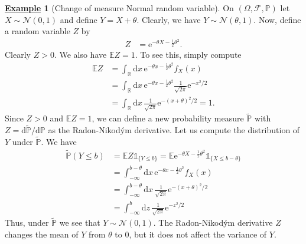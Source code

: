 \documentclass[12pt]{book}
\numberwithin{equation}{chapter}
\theoremstyle{plain}
\numberwithin{theorem}{section}
\theoremstyle{definition}
\newtheorem{example}[theorem]{\underline{Example}}
\numberwithin{exercise}{chapter}
\newcommand{\<}{\langle}
\renewcommand{\>}{\rangle}
\renewcommand{\(}{\left(}
\renewcommand{\)}{\right)}
\renewcommand{\[}{\left[}
\renewcommand{\]}{\right]}
\newcommand\Eb{\mathds{E}}
\newcommand\Ib{\mathds{1}} 	%
\newcommand\Pb{\mathds{P}}
\newcommand\Rb{\mathds{R}}
\newcommand\Fc{\mathscr{F}}
\newcommand\Nc{\mathscr{N}}
\newcommand\Om{\Omega}
\newcommand\Pbt{\widetilde{\Pb}}
\newcommand\dd{\mathrm{d}}
\newcommand\ee{\mathrm{e}}
\begin{document}
\begin{example}[Change of measure Normal random variable]
\label{ex:normal.meas.change}
On $(\Om, \Fc, \Pb)$ let $X \sim \Nc(0,1)$ and define $Y = X + \theta$.  Clearly, we have $Y \sim \Nc(\theta,1)$.
Now, define a random variable $Z$ by
\begin{align}
Z
	&=	\ee^{ - \theta X - \tfrac{1}{2} \theta^2 } .
\end{align} 
Clearly $Z > 0$.  We also have $\Eb Z = 1$.  To see this, simply compute
\begin{align}
\Eb Z
	&=	\int_\Rb \dd x \, \ee^{ - \theta x - \tfrac{1}{2} \theta^2 } f_X(x) \\
	&=	\int_\Rb \dd x \, \ee^{ - \theta x - \tfrac{1}{2} \theta^2 } \frac{1}{\sqrt{2\pi}}\ee^{-x^2/2} \\
	&=	\int_\Rb \dd x \,  \frac{1}{\sqrt{2\pi}}\ee^{-(x+\theta)^2/2} = 1 .
\end{align}
Since $Z > 0$ and $\Eb Z = 1$, we can define a new probability measure $\Pbt$ with $Z = \dd \Pbt / \dd \Pb$ as the Radon-Nikod\'ym derivative.  Let us compute the distribution of $Y$ under $\Pbt$.  We have
\begin{align}
\Pbt( Y \leq b)
	&=	\Eb Z \Ib_{\{ Y \leq b \}} 
	=		\Eb \ee^{- \theta X - \tfrac{1}{2} \theta^2 } \Ib_{\{X \leq b - \theta \}} \\
	&=	\int_{-\infty}^{b - \theta} \dd x \,  \ee^{ - \theta x - \tfrac{1}{2} \theta^2 } f_X(x) \\
	&=	\int_{-\infty}^{b - \theta} \dd x \, \frac{1}{\sqrt{2\pi}}\ee^{-(x+\theta)^2/2} \\
	&=	\int_{-\infty}^{b} \dd z \, \frac{1}{\sqrt{2\pi}}\ee^{-z^2/2}
\end{align}
Thus, under $\Pbt$ we see that $Y \sim \Nc(0,1)$.  The Radon-Nikod\'ym derivative $Z$ changes the mean of $Y$ from $\theta$ to $0$, but it does not affect the variance of $Y$.
\end{example}
\end{document}

